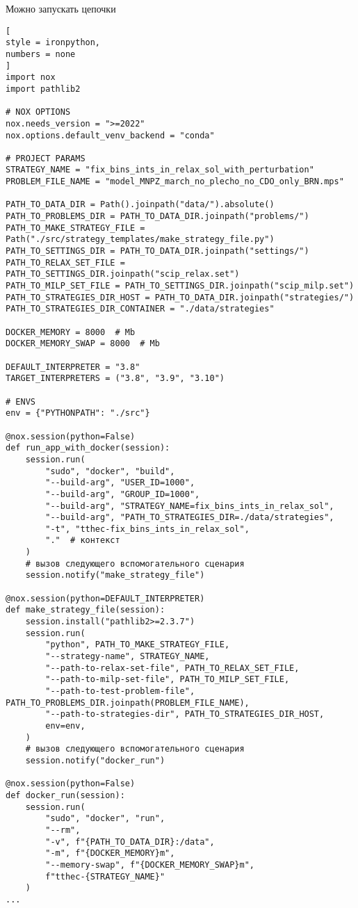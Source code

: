 \documentclass[%
	11pt,
	a4paper,
	utf8,
		]{article}
\begin{document}
Можно запускать цепочки
\begin{lstlisting}[
style = ironpython,
numbers = none
]
import nox
import pathlib2

# NOX OPTIONS
nox.needs_version = ">=2022"
nox.options.default_venv_backend = "conda"

# PROJECT PARAMS
STRATEGY_NAME = "fix_bins_ints_in_relax_sol_with_perturbation"
PROBLEM_FILE_NAME = "model_MNPZ_march_no_plecho_no_CDO_only_BRN.mps"

PATH_TO_DATA_DIR = Path().joinpath("data/").absolute()
PATH_TO_PROBLEMS_DIR = PATH_TO_DATA_DIR.joinpath("problems/")
PATH_TO_MAKE_STRATEGY_FILE = Path("./src/strategy_templates/make_strategy_file.py")
PATH_TO_SETTINGS_DIR = PATH_TO_DATA_DIR.joinpath("settings/")
PATH_TO_RELAX_SET_FILE = PATH_TO_SETTINGS_DIR.joinpath("scip_relax.set")
PATH_TO_MILP_SET_FILE = PATH_TO_SETTINGS_DIR.joinpath("scip_milp.set")
PATH_TO_STRATEGIES_DIR_HOST = PATH_TO_DATA_DIR.joinpath("strategies/")
PATH_TO_STRATEGIES_DIR_CONTAINER = "./data/strategies"

DOCKER_MEMORY = 8000  # Mb
DOCKER_MEMORY_SWAP = 8000  # Mb

DEFAULT_INTERPRETER = "3.8"
TARGET_INTERPRETERS = ("3.8", "3.9", "3.10")

# ENVS
env = {"PYTHONPATH": "./src"}

@nox.session(python=False)
def run_app_with_docker(session):
	session.run(
		"sudo", "docker", "build",
		"--build-arg", "USER_ID=1000",
		"--build-arg", "GROUP_ID=1000",
		"--build-arg", "STRATEGY_NAME=fix_bins_ints_in_relax_sol",
		"--build-arg", "PATH_TO_STRATEGIES_DIR=./data/strategies",
		"-t", "tthec-fix_bins_ints_in_relax_sol",
		"."  # контекст
	)
	# вызов следующего вспомогательного сценария
	session.notify("make_strategy_file")
	
@nox.session(python=DEFAULT_INTERPRETER)
def make_strategy_file(session):
    session.install("pathlib2>=2.3.7")
    session.run(
	    "python", PATH_TO_MAKE_STRATEGY_FILE,
	    "--strategy-name", STRATEGY_NAME,
	    "--path-to-relax-set-file", PATH_TO_RELAX_SET_FILE,
	    "--path-to-milp-set-file", PATH_TO_MILP_SET_FILE,
	    "--path-to-test-problem-file", PATH_TO_PROBLEMS_DIR.joinpath(PROBLEM_FILE_NAME),
	    "--path-to-strategies-dir", PATH_TO_STRATEGIES_DIR_HOST,
	    env=env,
    )
    # вызов следующего вспомогательного сценария
    session.notify("docker_run")
    
@nox.session(python=False)
def docker_run(session):
	session.run(
		"sudo", "docker", "run",
		"--rm",
		"-v", f"{PATH_TO_DATA_DIR}:/data",
		"-m", f"{DOCKER_MEMORY}m",
		"--memory-swap", f"{DOCKER_MEMORY_SWAP}m",
		f"tthec-{STRATEGY_NAME}"
	)
...
\end{lstlisting}
\end{document}
